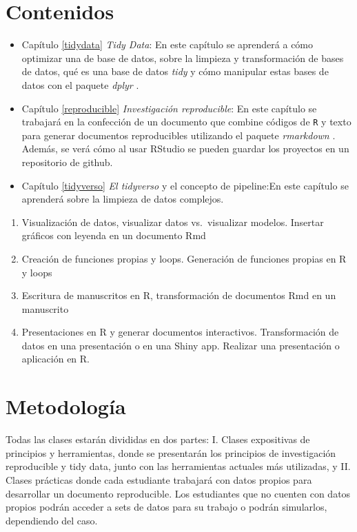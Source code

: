 \documentclass[]{book}
\begin{document}
\hypertarget{contenidos}{%
\section{Contenidos}\label{contenidos}}

\begin{itemize}
\item
  Capítulo \ref{tidydata} \emph{Tidy Data}: En este capítulo se
  aprenderá a cómo optimizar una de base de datos, sobre la limpieza y
  transformación de bases de datos, qué es una base de datos \emph{tidy}
  y cómo manipular estas bases de datos con el paquete \emph{dplyr}
  \citep{R-dplyr}.
\item
  Capítulo \ref{reproducible} \emph{Investigación reproducible}: En este
  capítulo se trabajará en la confección de un documento que combine
  códigos de \texttt{R} y texto para generar documentos reproducibles
  utilizando el paquete \emph{rmarkdown} \citep{Allaire2018}. Además, se
  verá cómo al usar RStudio se pueden guardar los proyectos en un
  repositorio de github.
\item
  Capítulo \ref{tidyverso} \emph{El tidyverso} y el concepto de
  pipeline:En este capítulo se aprenderá sobre la limpieza de datos
  complejos.
\end{itemize}

\begin{enumerate}
\def\labelenumi{\arabic{enumi}.}
\setcounter{enumi}{4}
\item
  Visualización de datos, visualizar datos vs.~visualizar modelos.
  Insertar gráficos con leyenda en un documento Rmd
\item
  Creación de funciones propias y loops. Generación de funciones propias
  en R y loops
\item
  Escritura de manuscritos en R, transformación de documentos Rmd en un
  manuscrito
\item
  Presentaciones en R y generar documentos interactivos. Transformación
  de datos en una presentación o en una Shiny app. Realizar una
  presentación o aplicación en R.
\end{enumerate}

\hypertarget{metodologia}{%
\section{Metodología}\label{metodologia}}

Todas las clases estarán divididas en dos partes: I. Clases expositivas
de principios y herramientas, donde se presentarán los principios de
investigación reproducible y tidy data, junto con las herramientas
actuales más utilizadas, y II. Clases prácticas donde cada estudiante
trabajará con datos propios para desarrollar un documento reproducible.
Los estudiantes que no cuenten con datos propios podrán acceder a sets
de datos para su trabajo o podrán simularlos, dependiendo del caso.
\end{document}
